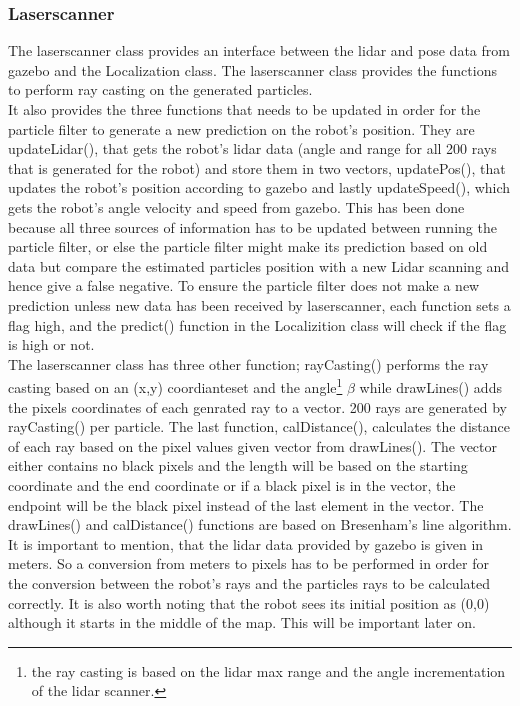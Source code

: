 \documentclass[../../../Main.tex]{subfiles}
\begin{document}
\subsubsection*{Laserscanner}
The laserscanner class provides an interface between the lidar and pose data from gazebo and the Localization class.
The laserscanner class provides the functions to perform ray casting on the generated particles.\\
It also provides the three functions that needs to be updated in order for the particle filter to generate a new prediction on the robot's position.
They are updateLidar(), that gets the robot's lidar data (angle and range for all 200 rays that is generated for the robot) and store them in two vectors, updatePos(), that updates the robot's position according to gazebo and lastly updateSpeed(), which gets the robot's angle velocity and speed from gazebo.
This has been done because all three sources of information has to be updated between running the particle filter, or else the particle filter might make its prediction based on old data but compare the estimated particles position with a new Lidar scanning and hence give a false negative.
To ensure the particle filter does not make a new prediction unless new data has been received by laserscanner, each function sets a flag high, and the predict() function in the Localizition class will check if the flag is high or not.\\

The laserscanner class has three other function; rayCasting() performs the ray casting based on an (x,y) coordianteset and the angle\footnote{the ray casting is based on the lidar max range and the angle incrementation of the lidar scanner.} $\beta$ while drawLines() adds the pixels coordinates of each genrated ray to a vector. 200 rays are generated by rayCasting() per particle. The last function, calDistance(), calculates the distance of each ray based on the pixel values given vector from drawLines().
The vector either contains no black pixels and the length will be based on the starting coordinate and the end coordinate or if a black pixel is in the vector, the endpoint will be the black pixel instead of the last element in the vector.
The drawLines() and calDistance() functions are based on Bresenham's line algorithm.\\

It is important to mention, that the lidar data provided by gazebo is given in meters. So a conversion from meters to pixels has to be performed in order for the conversion between the robot's rays and the particles rays to be calculated correctly. It is also worth noting that the robot sees its initial position as (0,0) although it starts in the middle of the map. This will be important later on.
\end{document}
